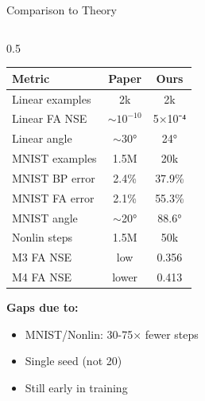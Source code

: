 \documentclass[aspectratio=169,10pt]{beamer}
\begin{document}
\begin{frame}{Comparison to Theory}
\begin{columns}[T]
\begin{column}{0.5\textwidth}
      \vspace{0.3cm}
      \begin{table}
        \centering
        \small
        \begin{tabular}{lcc}
          \toprule
          \textbf{Metric} & \textbf{Paper} & \textbf{Ours} \\
          \midrule
          Linear examples & 2k & 2k \\
          Linear FA NSE & $\sim10^{-10}$ & 5×10⁻⁴ \\
          Linear angle & $\sim$30° & \alert{24°} \\
          \midrule
          MNIST examples & 1.5M & \alert{20k} \\
          MNIST BP error & 2.4\% & \alert{37.9\%} \\
          MNIST FA error & 2.1\% & \alert{55.3\%} \\
          MNIST angle & $\sim$20° & \alert{88.6°} \\
          \midrule
          Nonlin steps & 1.5M & \alert{50k} \\
          M3 FA NSE & low & \alert{0.356} \\
          M4 FA NSE & lower & \alert{0.413} \\
          \bottomrule
        \end{tabular}
      \end{table}

      \vspace{0.2cm}
      \textbf{Gaps due to:}
      \begin{itemize}
        \item MNIST/Nonlin: 30-75× fewer steps
        \item Single seed (not 20)
        \item Still early in training
      \end{itemize}
    \end{column}
  \end{columns}
\end{frame}
\end{document}
